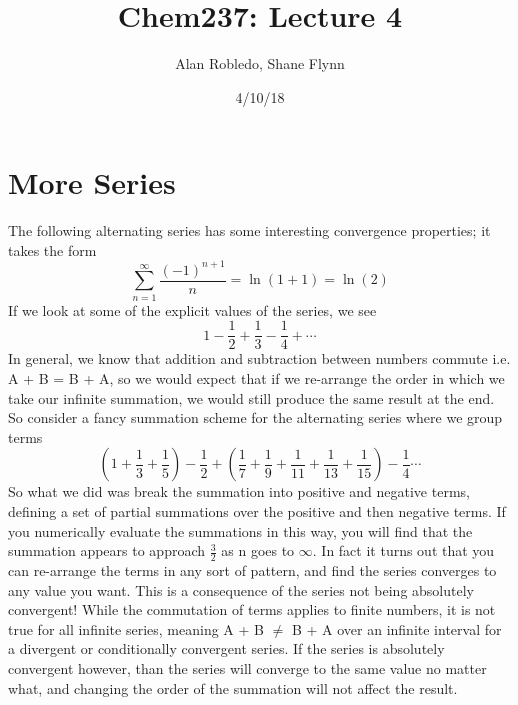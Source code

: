 \documentclass{article}
\title{Chem237: Lecture 4}
\date{4/10/18}
\author{Alan Robledo, Shane Flynn}
\newcommand{\be}{\begin{equation}}
\newcommand{\ee}{\end{equation}}
\newcommand{\sumone}{\sum_{n=1}^\infty}
\begin{document}
\maketitle
\section*{More Series}
The following alternating series has some interesting convergence properties; it takes the form
\be
\sumone \frac{(-1)^{n+1}}{n} = \ln (1+1) = \ln (2)
\ee
If we look at some of the explicit values of the series, we see
\be
1 - \frac{1}{2} + \frac{1}{3} - \frac{1}{4} + \cdots
\ee
In general, we know that addition and subtraction between numbers commute i.e. A + B = B + A, so we would expect that if we re-arrange the order in which we take our infinite summation, we would still produce the same result at the end.
So consider a fancy summation scheme for the alternating series where we group terms
\be
\left(1 + \frac{1}{3} + \frac{1}{5}\right) - \frac{1}{2} + \left(\frac{1}{7} + \frac{1}{9} + \frac{1}{11} + \frac{1}{13} + \frac{1}{15}\right) - \frac{1}{4} \cdots
\ee
So what we did was break the summation into positive and negative terms, defining a set of partial summations over the positive and then negative terms.
If you numerically evaluate the summations in this way, you will find that the summation appears to approach $\frac{3}{2}$ as n goes to $\infty$.
In fact it turns out that you can re-arrange the terms in any sort of pattern, and find the series converges to any value you want.
This is a consequence of the series not being absolutely convergent!
While the commutation of terms applies to finite numbers, it is not true for all infinite series, meaning A + B $\neq$ B + A over an infinite interval for a divergent or conditionally convergent series.
If the series is absolutely convergent however, than the series will converge to the same value no matter what, and changing the order of the summation will not affect the result.
\end{document}
